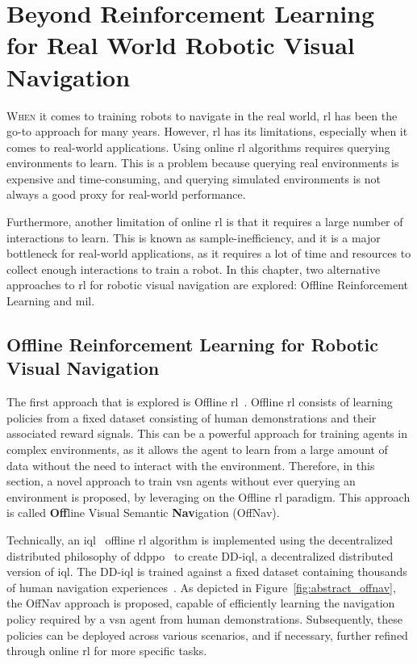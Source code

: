 \chapter[Beyond RL for Real World Robotic Navigation]{Beyond Reinforcement Learning for Real World Robotic Visual Navigation}\label{ch:beyond-rl}

\lettrine{\textcolor{accent_color}{W}}{hen} it comes to training robots to navigate in the real world, \acrshort{rl} has been the go-to approach for many years.
However, \acrshort{rl} has its limitations, especially when it comes to real-world applications.
Using online \acrshort{rl} algorithms requires querying environments to learn.
This is a problem because querying real environments is expensive and time-consuming, and querying simulated environments is not always a good proxy for real-world performance.

Furthermore, another limitation of online \acrshort{rl} is that it requires a large number of interactions to learn.
This is known as sample-inefficiency, and it is a major bottleneck for real-world applications, as it requires a lot of time and resources to collect enough interactions to train a robot.
In this chapter, two alternative approaches to \acrshort{rl} for robotic visual navigation are explored: Offline Reinforcement Learning and \acrfull{mil}.


\section{Offline Reinforcement Learning for Robotic Visual Navigation}\label{sec:offline_rl4rvsn}

The first approach that is explored is Offline \acrshort{rl}~\cite{levine2020}.
Offline \acrshort{rl} consists of learning policies from a fixed dataset consisting of human demonstrations and their associated reward signals.
This can be a powerful approach for training agents in complex environments, as it allows the agent to learn from a large amount of data without the need to interact with the environment.
Therefore, in this section, a novel approach to train \acrshort{vsn} agents without ever querying an environment is proposed, by leveraging on the Offline \acrshort{rl} paradigm.
This approach is called \textbf{Off}line Visual Semantic \textbf{Nav}igation (OffNav).

Technically, an \acrfull{iql}~\cite{kostrikov2022offline} offline \acrshort{rl} algorithm is implemented using the decentralized distributed philosophy of \acrshort{ddppo}~\cite{wijmans2020} to create DD-\acrshort{iql}, a decentralized distributed version of \acrshort{iql}\@.
The DD-\acrshort{iql} is trained against a fixed dataset containing thousands of human navigation experiences~\cite{ramrakhya2023}.
As depicted in Figure~\ref{fig:abstract_offnav}, the OffNav approach is proposed, capable of efficiently learning the navigation policy required by a \acrshort{vsn} agent from human demonstrations.
Subsequently, these policies can be deployed across various scenarios, and if necessary, further refined through online \acrshort{rl} for more specific tasks.

